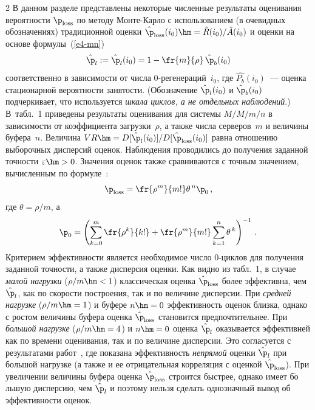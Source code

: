\begin{multicols}{2}
В данном разделе представлены
некоторые чис\-лен\-ные результаты оценивания вероятности  $\p_{\mathrm{loss}}$ по методу
Мон\-те-Кар\-ло с использованием (в очевидных обозначениях) традиционной оценки
$\hat{\p}_{\mathrm{loss}}(i_0)\hm=\hat{R}(i_0)/\hat{A}(i_0)$ и оценки на основе формулы~(\ref{e4-mn})
 $$
  \hat{\p}_l:=\hat{\p}_l(i_0)=1-\fr{m}{\rho}\,\hat{\p}_b(i_0)
$$
 соответственно в зависимости от   чис\-ла 0-ре\-ге\-не\-ра\-ций~$i_0$, где
$\hat{P_b}(i_0)$~--- оценка стационарной вероятности занятости. (Обозначение 
$\hat{\p}_l(i_0)$ и $\hat{\p}_b(i_0)$ 
 подчеркивает, что используется {\it шкала циклов, а не отдельных
наблюдений}.) В~табл.~1 приведены результаты оценивания  для  сис\-те\-мы
$M/M/m/n$  в зависимости от коэффициента загрузки~$\rho$, а также чис\-ла
серверов~$m$ и величины буфера~$n$. Величина
$VR\hm=D[\hat{\p}_l(i_0)]/D[\hat{\p}_{\mathrm{loss}}(i_0)]$ равна отношению выборочных
дисперсий оценок. Наблюдения проводились до получения заданной точности
$\varepsilon\hm>0$. Значения оценок также сравниваются  с точным значением,
вычисленным по формуле~\cite{Gnedenko}:
\begin{equation*} 
 \p_{\mathrm{loss}}=\fr{\rho^{m}}{m!}\theta ^{\,n}\p_0\,,
\end{equation*} 
где $\theta=\rho/m$, а 
\begin{equation*} 
\p_0=\left(\sum\limits_{k=0}^m\fr{\rho^k}{k!}+\fr{\rho^m}{m!}\sum\limits_{k=1}^n
\theta^{\,k}\right)^{-1}\,. 
\end{equation*} 
Критерием эффективности является необходимое число 0-цик\-лов для получения заданной точности,
а также  дисперсия  оценки.
Как видно из табл.~1,
в случае \textit{малой нагрузки} ($\rho/m\hm<1$) классическая оценка
$\hat{\p}_{\mathrm{loss}}$ более  эффективна, чем
 $\hat{\p}_l$,  как по скорости построения, так и по величине  дисперсии.
При \textit{средней нагрузке} ($\rho/m\hm=1$) и  буфере $n\hm=0$
эффективность оценок близка, однако с ростом величины   буфера
оценка $\hat{\p}_{\mathrm{loss}}$ становится предпочтительнее. При
\textit{большой нагрузке} ($\rho/m\hm=4$) и $n\hm=0$ оценка $\hat{\p}_l$
оказывается эффективней как по времени оценивания, так и по
величине дисперсии.  Это согласуется с результатами работ~\cite{Whitt90, MorNek}, 
где  показана эффективность {\it непрямой}
оценки $\hat{\p}_l$ при большой нагрузке (а также и ее отрицательная
корреляция с оценкой $\hat{\p}_{\mathrm{loss}}$). При увеличении величины
буфера оценка $\hat{\p}_{\mathrm{loss}}$ строится быстрее, однако имеет
б$\acute{\mbox{о}}$льшую дисперсию, чем $\hat{\p}_l$ и поэтому нельзя
сделать однозначный вывод об эффективности оценок.




\end{multicols}
